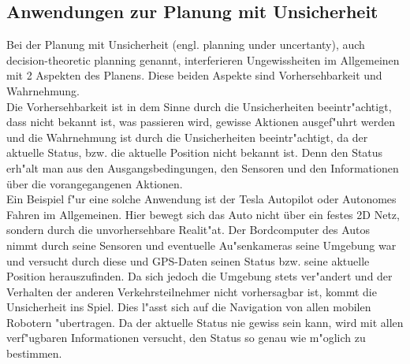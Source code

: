 \subsection{Anwendungen zur Planung mit Unsicherheit}
Bei der Planung mit Unsicherheit (engl. planning under uncertanty), auch decision-theoretic planning genannt, interferieren Ungewissheiten im Allgemeinen mit 2 Aspekten des Planens. Diese beiden Aspekte sind Vorhersehbarkeit und Wahrnehmung.\\
Die Vorhersehbarkeit ist in dem Sinne durch die Unsicherheiten beeintr"achtigt, dass nicht bekannt ist, was passieren wird, gewisse Aktionen ausgef"uhrt werden und die Wahrnehmung ist durch die Unsicherheiten beeintr"achtigt, da der aktuelle Status, bzw. die aktuelle Position nicht bekannt ist. Denn den Status erh"alt man aus den Ausgangsbedingungen, den Sensoren und den Informationen über die vorangegangenen Aktionen.\\
Ein Beispiel f"ur eine solche Anwendung ist der Tesla Autopilot oder Autonomes Fahren im Allgemeinen. Hier bewegt sich das Auto nicht über ein festes 2D Netz, sondern durch die unvorhersehbare Realit"at. Der Bordcomputer des Autos nimmt durch seine Sensoren und eventuelle Au"senkameras seine Umgebung war und versucht durch diese und GPS-Daten seinen Status bzw. seine aktuelle Position herauszufinden. Da sich jedoch die Umgebung stets ver"andert und der Verhalten der anderen Verkehrsteilnehmer nicht vorhersagbar ist, kommt die Unsicherheit ins Spiel.
Dies l"asst sich auf die Navigation von allen mobilen Robotern "ubertragen.
Da der aktuelle Status nie gewiss sein kann, wird mit allen verf"ugbaren Informationen versucht, den Status so genau wie m"oglich zu bestimmen.
